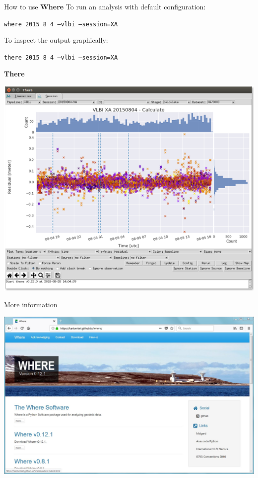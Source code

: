 \documentclass[14pt,c]{beamer}
\begin{document}
\begin{frame}[fragile]{How to use \textbf{Where}}
To run an analysis with default configuration:
\begin{shaded*}\texttt{where 2015 8 4 --vlbi --session=XA}\end{shaded*}
To inspect the output graphically: 
\begin{shaded*}\texttt{there 2015 8 4 --vlbi --session=XA}\end{shaded*}
\end{frame}

\begin{frame}{\textbf{There}}
\begin{centering}
\includegraphics[height=0.8\textheight]{figure/there_residuals}
\end{centering}
\end{frame}


\begin{frame}{More information}
\begin{centering}
\includegraphics[width=0.95\linewidth]{figure/screenshot_github}
\end{centering}
\end{frame}
\end{document}
